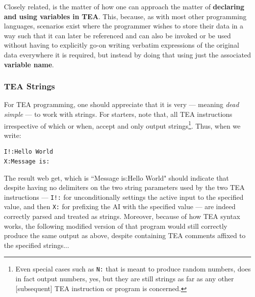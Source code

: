 \documentclass[a4paper, 18pt]{book} %
\begin{document}
{{{\begin{appendices}
\vspace{2em}

Closely related, is the matter of how one can approach the matter of \textbf{declaring and using variables in TEA}. This, because, as with most other programming languages, scenarios exist where the programmer wishes to store their data in a way such that it can later be referenced and can also be invoked or be used without having to explicitly go-on writing verbatim expressions of the original data everywhere it is required, but instead by doing that using just the associated \textbf{variable name}.


\subsubsection{TEA Strings}
\label{SECTEASTR}


For TEA programming, one should appreciate that it is very --- meaning \textit{dead simple} --- to work with strings. For starters, note that, all TEA instructions irrespective of which or when, accept and only output strings\footnote{Even special cases such as \texttt{N:} that is meant to produce random numbers, does in fact output numbers, yes, but they are still strings as far as any other [subsequent] TEA instruction or program is concerned.}. Thus, when we write:


\vspace{2em}

  \begin{tcolorbox}[teaterminalstyle, title=TEA STRINGS: Example 1: Strings without Delimiters, breakable]
  \begin{lstlisting}[language=TEA,breaklines=true,]
I!:Hello World
X:Message is:
   \end{lstlisting}
  \end{tcolorbox}

\vspace{2em}


The result web get, which is ``Message is:Hello World" should indicate that despite having no delimiters on the two string parameters used by the two TEA instructions --- \texttt{I!:} for unconditionally settings the active input to the specified value, and then \texttt{X:} for prefixing the AI with the specified value --- are indeed correctly parsed and treated as strings. Moreover, because of how TEA syntax works, the following modified version of that program would still correctly produce the same output as above, despite containing TEA comments affixed to the specified strings...



\end{appendices}}}}
\end{document}
